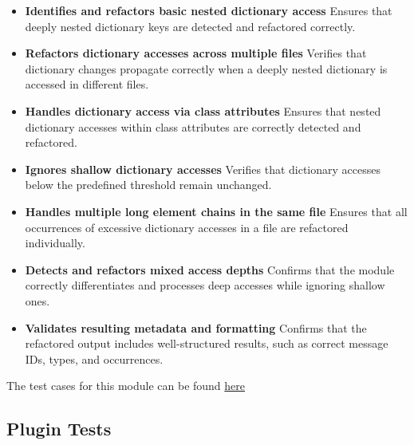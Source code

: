 \documentclass[12pt, titlepage]{article}
\begin{document}
\begin{itemize}
\item \textbf{Identifies and refactors basic nested dictionary access} \newline
Ensures that deeply nested dictionary keys are detected and refactored correctly.

\item \textbf{Refactors dictionary accesses across multiple files} \newline
Verifies that dictionary changes propagate correctly when a deeply nested dictionary is accessed in different files.

\item \textbf{Handles dictionary access via class attributes} \newline
Ensures that nested dictionary accesses within class attributes are correctly detected and refactored.

\item \textbf{Ignores shallow dictionary accesses} \newline
Verifies that dictionary accesses below the predefined threshold remain unchanged.

\item \textbf{Handles multiple long element chains in the same file} \newline
Ensures that all occurrences of excessive dictionary accesses in a file are refactored individually.

\item \textbf{Detects and refactors mixed access depths} \newline
Confirms that the module correctly differentiates and processes deep accesses while ignoring shallow ones.

\item \textbf{Validates resulting metadata and formatting} \newline
Confirms that the refactored output includes well-structured results, such as correct message IDs, types, and occurrences.
\end{itemize}

\noindent The test cases for this module can be found \href{https://github.com/ssm-lab/capstone--source-code-optimizer/blob/new-poc/tests/refactorers/test_long_element_chain.py}{here}



\subsection{Plugin Tests}
\end{document}
